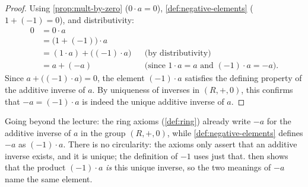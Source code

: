 \begin{content}


\begin{proof}
Using \cref{prop:mult-by-zero} ($0 \cdot a = 0$), \cref{def:negative-elements} ($1 + (-1) = 0$), and distributivity:
\begin{align*}
0 &= 0 \cdot a \\
&= \bigl(1 + (-1)\bigr) \cdot a \\
&= (1 \cdot a) + \bigl((-1) \cdot a\bigr) && \text{(by distributivity)} \\
&= a + (-a) && \text{(since $1 \cdot a = a$ and $(-1) \cdot a = -a$)}.
\end{align*}
Since $a + \bigl((-1) \cdot a\bigr) = 0$, the element $(-1) \cdot a$ satisfies the defining property of the additive inverse of $a$. By uniqueness of inverses in $(R, +, 0)$, this confirms that $-a = (-1) \cdot a$ is indeed the unique additive inverse of $a$.
\end{proof}

\begin{steps}
Going beyond the lecture: the ring axioms (\cref{def:ring}) already write $-a$ for the additive inverse of $a$ in the group $(R, +, 0)$, while \cref{def:negative-elements} defines $-a$ as $(-1) \cdot a$. There is no circularity: the axioms only assert that an additive inverse exists, and it is unique; the definition of $-1$ uses just that.  then shows that the product $(-1) \cdot a$ \emph{is} this unique inverse, so the two meanings of $-a$ name the same element.
\end{steps}
\end{content}


